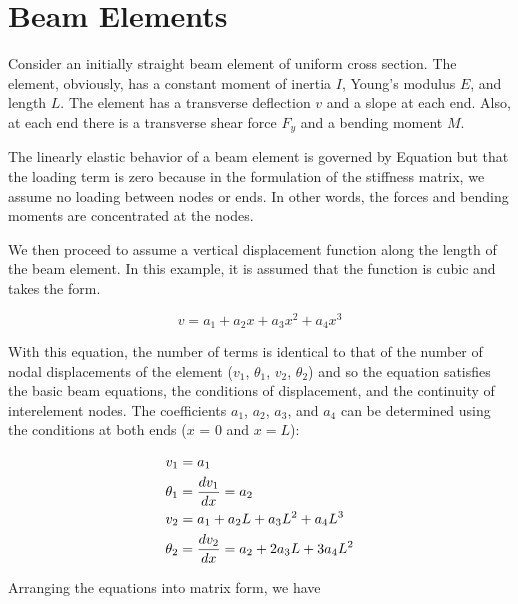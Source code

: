 \documentclass[
10pt,
a4paper,
openany,
svgnames,
]{book}
\begin{document}
\section{Beam Elements}

Consider an initially straight beam element of uniform cross section. The element, obviously, has a constant moment of inertia $I$, Young’s modulus $E$, and length $L$. The element has a transverse deflection $v$ and a slope at each end. Also, at each end there is a transverse shear force $F_y$ and a bending moment $M$.

The linearly elastic behavior of a beam element is governed by Equation but that the loading term is zero because in the formulation of the stiffness matrix, we assume no loading between nodes or ends. In other words, the forces and bending moments are concentrated at the nodes.

We then proceed to assume a vertical displacement function along the length of the beam element. In this example, it is assumed that the function is cubic and takes the form.

\begin{equation} \label{eqn: beam element displacement function}
  v = a_1 + a_2x + a_3x^2 + a_4x^3
\end{equation}

With this equation, the number of terms is identical to that of the number of nodal displacements of the element ($v_1$, $\theta_1$, $v_2$, $\theta_2$) and so the equation satisfies the basic beam equations, the conditions of displacement, and the continuity of interelement nodes. The coefficients $a_1$, $a_2$, $a_3$, and $a_4$ can be determined using the conditions at both ends ($x$ = 0 and $x = L$):

\[\begin{gathered}
  v_1 = a_1 \hfill \\
  \theta _1 = \frac{dv_1}{dx} = a_2 \hfill \\
  v_2 = a_1 + a_2L + a_3L^2 + a_4L^3 \hfill \\
  \theta_2 = \frac{dv_2}{dx} = a_2 + 2a_3L + 3a_4L^2 \hfill \\ 
\end{gathered} \]

Arranging the equations into matrix form, we have
\end{document}
